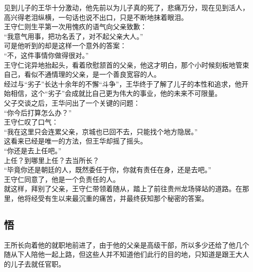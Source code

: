 \begin{multicols}{\theparacolNo}
见到儿子的王华十分激动，他先前以为儿子真的死了，悲痛万分，现在见到活人，高兴得老泪纵横，一句话也说不出口，只是不断地抹着眼泪。\\

王守仁则生平第一次用愧疚的语气向父亲致歉：\\

“我意气用事，把功名丢了，对不起父亲大人。”\\

可是他听到的却是这样一个意外的答案：\\

“不，这件事情你做得很对。”\\

王守仁诧异地抬起头，看着欣慰颔首的父亲，他这才明白，那个小时候刻板地管束自己，看似不通情理的父亲，是一个善良宽容的人。\\

经过与“劣子”长达十余年的不懈“斗争”，王华终于了解了儿子的本性和追求，他开始相信，这个“劣子”会成就比自己更为伟大的事业，他的未来不可限量。\\

父子交谈之后，王华问出了一个关键的问题：\\

“你今后打算怎么办？”\\

王守仁叹了口气：\\

“我在这里只会连累父亲，京城也已回不去，只能找个地方隐居。”\\

这看来已经是唯一的方法，但王华却摇了摇头。\\

“你还是去上任吧。”\\

上任？到哪里上任？去当所长？\\

“毕竟你还是朝廷的人，既然委任于你，你就有责任在身，还是去吧。”\\

王守仁同意了，他是一个负责任的人。\\

就这样，拜别了父亲，王守仁带领着随从，踏上了前往贵州龙场驿站的道路。在那里，他将经受有生以来最沉重的痛苦，并最终获知那个秘密的答案。\\

\subsection{悟}
王所长向着他的就职地前进了，由于他的父亲是高级干部，所以多少还给了他几个随从下人陪他一起上路，但这些人并不知道他们此行的目的地，只知道是跟王大人的儿子去就任官职。\\


\end{multicols}
